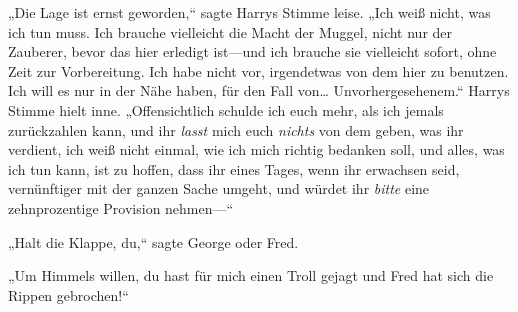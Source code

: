 „Die Lage ist ernst geworden,“ sagte Harrys Stimme leise. „Ich weiß nicht, was ich tun muss. Ich brauche vielleicht die Macht der Muggel, nicht nur der Zauberer, bevor das hier erledigt ist—und ich brauche sie vielleicht sofort, ohne Zeit zur Vorbereitung. Ich habe nicht vor, irgendetwas von dem hier zu benutzen. Ich will es nur in der Nähe haben, für den Fall von… Unvorhergesehenem.“
Harrys Stimme hielt inne.
„Offensichtlich schulde ich euch mehr, als ich jemals zurückzahlen kann, und ihr \emph{lasst} mich euch \emph{nichts} von dem geben, was ihr verdient, ich weiß nicht einmal, wie ich mich richtig bedanken soll, und alles, was ich tun kann, ist zu hoffen, dass ihr eines Tages, wenn ihr erwachsen seid, vernünftiger mit der ganzen Sache umgeht, und würdet ihr \emph{bitte} eine zehnprozentige Provision nehmen—“

„Halt die Klappe, du,“ sagte George oder Fred.

„Um Himmels willen, du hast für mich einen Troll gejagt und Fred hat sich die Rippen gebrochen!“

